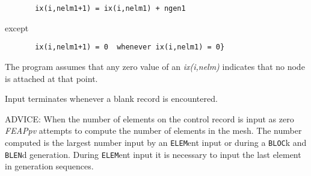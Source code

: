 \begin{verbatim}
       ix(i,nelm1+1) = ix(i,nelm1) + ngen1
\end{verbatim}
except
\begin{verbatim}
       ix(i,nelm1+1) = 0  whenever ix(i,nelm1) = 0}
\end{verbatim}

The program assumes that any zero value of an {\it ix(i,nelm)}
indicates that no node is attached at that point.

Input terminates whenever a blank record is encountered.

ADVICE: When the number of elements on the control record is input as
zero {\sl FEAPpv} attempts to compute the number of elements in the mesh.
The number computed is the largest number input by an {\tt ELEM}ent
input or during a {\tt BLOC}k and {\tt BLEN}d
generation.  During {\tt ELEM}ent input
it is necessary to input the last element in generation sequences.
\vfil\eject
